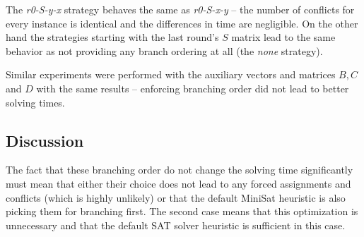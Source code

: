 The \emph{r0-S-y-x} strategy behaves the same as \emph{r0-S-x-y} -- the number of conflicts for every instance is identical and the differences in time are negligible.
On the other hand the strategies starting with the last round's $S$ matrix lead to the same behavior as not providing any branch ordering at all (the \emph{none} strategy).

Similar experiments were performed with the auxiliary vectors and matrices $B, C$ and $D$ with the same results -- enforcing branching order did not lead to better solving times.

\subsection{Discussion}

The fact that these branching order do not change the solving time significantly must mean that either their choice does not lead to any forced assignments and conflicts (which is highly unlikely) or that the default MiniSat heuristic is also picking them for branching first.
The second case means that this optimization is unnecessary and that the default SAT solver heuristic is sufficient in this case.
